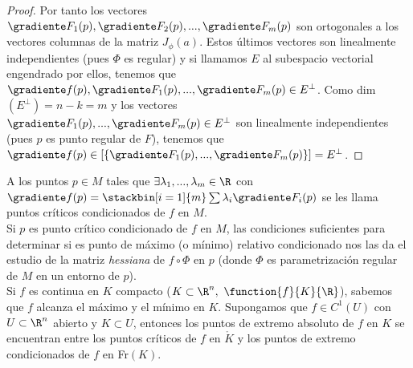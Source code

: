 \begin{proof}
Por tanto los vectores $\gradiente F_1(p),\gradiente F_2(p),...,\gradiente F_m(p)$ son ortogonales a los vectores columnas de la matriz $J_\phi(a)$. Estos últimos vectores son linealmente independientes (pues $\Phi$ es regular) y si llamamos $E$ al subespacio vectorial engendrado por ellos, tenemos que $\gradiente f(p),\gradiente F_1(p),...,\gradiente F_m(p)\in E^\perp$. Como dim$(E^\perp)=n-k=m$ y los vectores\\$\gradiente F_1(p),...,\gradiente F_m(p)\in E^\perp$ son linealmente independientes (pues $p$ es punto regular de $F$), tenemos que $\gradiente f(p)\in [\{\gradiente F_1(p),...,\gradiente F_m(p)\}]=E^\perp$.
\end{proof}

\begin{nota} A los puntos $p\in M$ tales que $\exists\lambda_1,...,\lambda_m\in\R$ con $\gradiente f(p)=\stackbin[i=1]{m}\sum\lambda_i\gradiente F_i(p)$ se les llama puntos críticos condicionados de $f$ en $M$.\\

Si $p$ es punto crítico condicionado de $f$ en $M$, las condiciones suficientes para determinar si es punto de máximo (o mínimo) relativo condicionado nos las da el estudio de la matriz \textit{hessiana} de $f\circ \Phi$ en $p$ (donde $\Phi$ es parametrización regular de $M$ en un entorno de $p$).\\

Si $f$ es continua en $K$ compacto ($K\subset\R^n,\ \function{f}{K}{\R}$), sabemos que $f$ alcanza el máximo y el mínimo en $K$. Supongamos que $f\in C^1(U)$ con $U\subset\R^n$ abierto y $K\subset U$, entonces los puntos de extremo absoluto de $f$ en $K$ se encuentran entre los puntos críticos de $f$ en $\mathring{K}$ y los puntos de extremo condicionados de $f$ en Fr$(K)$.
\end{nota}